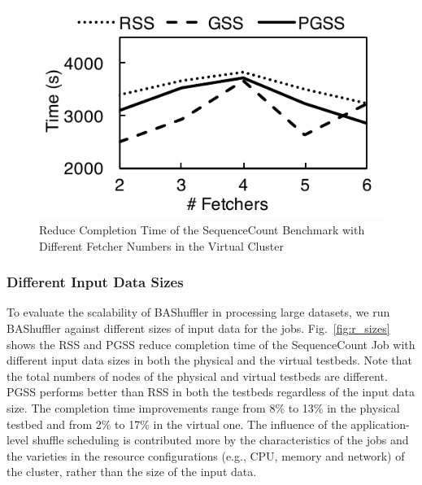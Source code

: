 \documentclass[10pt,journal,compsoc]{IEEEtran}
\begin{document}
\begin{figure}[!t]
\centering
\includegraphics[width=0.7\columnwidth,height=0.4\columnwidth]{figure10}
\caption{Reduce Completion Time of the SequenceCount Benchmark with Different Fetcher Numbers
in the Virtual Cluster}
\label{fig:r_vsequence}
\end{figure}




\subsubsection{Different Input Data Sizes}
To evaluate the scalability of BAShuffler in processing large datasets, 
we run BAShuffler against different sizes of input data for the jobs.
Fig.~\ref{fig:r_sizes} shows the RSS and PGSS reduce completion time of the
SequenceCount Job with different input data sizes
in both the physical and the virtual testbeds. 
Note that the total numbers of nodes of the physical and virtual testbeds are different.
PGSS performs better than RSS in both the testbeds regardless of the input data size. 
The completion time improvements range from 8\% to 13\% in the physical testbed
and from 2\% to 17\% in the virtual one. 
The influence of the application-level shuffle scheduling is contributed more by 
the characteristics of the jobs and the varieties in the resource configurations
(e.g., CPU, memory and network) of the cluster, rather than the size of the input data. 
\end{document}
